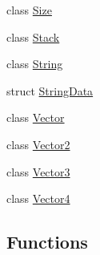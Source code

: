 \begin{DoxyCompactItemize}
\item 
class \hyperlink{classprism_1_1_size}{Size}
\item 
class \hyperlink{classprism_1_1_stack}{Stack}
\item 
class \hyperlink{classprism_1_1_string}{String}
\item 
struct \hyperlink{structprism_1_1_string_data}{String\+Data}
\item 
class \hyperlink{classprism_1_1_vector}{Vector}
\item 
class \hyperlink{classprism_1_1_vector2}{Vector2}
\item 
class \hyperlink{classprism_1_1_vector3}{Vector3}
\item 
class \hyperlink{classprism_1_1_vector4}{Vector4}
\end{DoxyCompactItemize}
\subsection*{Functions}
